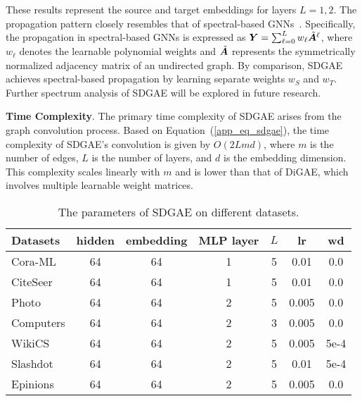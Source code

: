 These results represent the source and target embeddings for layers \(L=1, 2\). The propagation pattern closely resembles that of spectral-based GNNs~\cite{gprgnn,bernnet,chebnetii}. Specifically, the propagation in spectral-based GNNs is expressed as \({\bm{Y}} = \sum_{\ell=0}^{L}w_{\ell}\Tilde{{\bm{A}}}^{\ell}\), where \(w_{\ell}\) denotes the learnable polynomial weights and \(\Tilde{{\bm{A}}}\) represents the symmetrically normalized adjacency matrix of an undirected graph. By comparison, SDGAE achieves spectral-based propagation by learning separate weights \(w_S\) and \(w_T\). Further spectrum analysis of SDGAE will be explored in future research.





\textbf{Time Complexity}. The primary time complexity of SDGAE arises from the graph convolution process. Based on Equation~(\ref{app_eq_sdgae}), the time complexity of SDGAE's convolution is given by \( O(2Lmd) \), where \( m \) is the number of edges, \( L \) is the number of layers, and \( d \) is the embedding dimension. This complexity scales linearly with \( m \) and is lower than that of DiGAE, which involves multiple learnable weight matrices.


\begin{wraptable}{r}{105mm}
\centering
\vspace{-8mm}
\caption{The parameters of SDGAE on different datasets.}
\begin{tabular}{lcccccc}
\toprule
Datasets &hidden &embedding &MLP layer &$L$ &lr &wd  \\ \midrule
Cora-ML & 64 & 64 &1 &5 &0.01 &0.0 \\
CiteSeer& 64 & 64 &1 &5 &0.01 &0.0 \\
Photo & 64 & 64 &2 &5 &0.005 &0.0 \\
Computers & 64 & 64 &2 & 3 & 0.005 &0.0\\
WikiCS & 64 & 64 & 2&5 & 0.005 &5e-4 \\
Slashdot & 64 & 64 &2 &5 &0.01 & 5e-4 \\
Epinions & 64 & 64 &2 &5 & 0.005 &0.0 \\
\bottomrule
\end{tabular}
\vspace{-2mm}
\label{app_para_sdage}
\end{wraptable}

